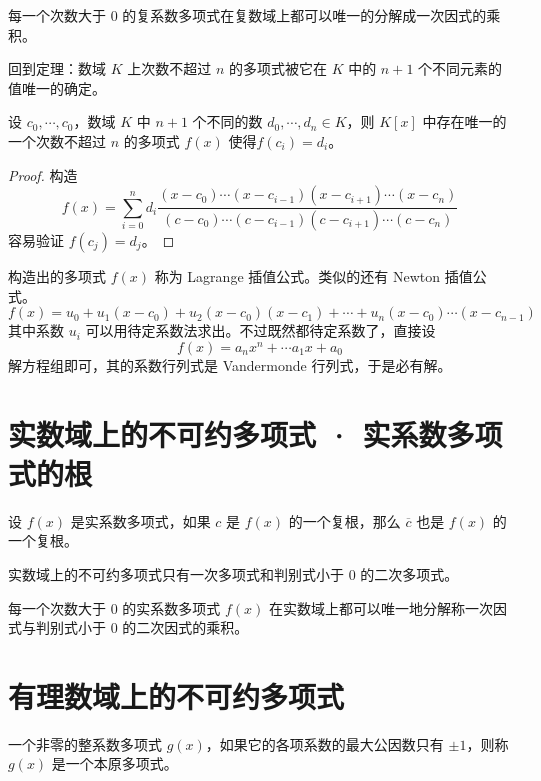 \begin{theorem}
    每一个次数大于 $0$ 的复系数多项式在复数域上都可以唯一的分解成一次因式的乘积。
\end{theorem}

回到定理：数域 $K$ 上次数不超过 $n$ 的多项式被它在 $K$ 中的 $n+1$ 个不同元素的值唯一的确定。

\begin{theorem}
    设 $c_0,\cdots,c_0$，数域 $K$ 中 $n+1$ 个不同的数 $d_0,\cdots,d_n \in K$，则 $K[x]$ 中存在唯一的一个次数不超过 $n$ 的多项式 $f(x)$ 使得$f(c_i) = d_i$。
\end{theorem}
\begin{proof}
    构造
    \[ f(x) = \sum_{i=0}^n d_i \frac{(x-c_0)\cdots(x-c_{i-1})(x-c_{i+1})\cdots(x-c_n)}{(c-c_0)\cdots(c-c_{i-1})(c-c_{i+1})\cdots(c-c_n)} \]
    容易验证 $f(c_j) = d_j$。
\end{proof}

构造出的多项式 $f(x)$ 称为 Lagrange 插值公式。类似的还有 Newton 插值公式。
\[ f(x) = u_0 + u_1(x-c_0) + u_2(x-c_0)(x-c_1) + \cdots + u_n(x-c_0)\cdots(x-c_{n-1}) \]
其中系数 $u_i$ 可以用待定系数法求出。不过既然都待定系数了，直接设
\[ f(x) = a_nx^n + \cdots a_1x + a_0 \]
解方程组即可，其的系数行列式是 Vandermonde 行列式，于是必有解。

\section{实数域上的不可约多项式 · 实系数多项式的根}

\begin{theorem}
    设 $f(x)$ 是实系数多项式，如果 $c$ 是 $f(x)$ 的一个复根，那么 $\overline{c}$ 也是 $f(x)$ 的一个复根。
\end{theorem}

\begin{theorem}
    实数域上的不可约多项式只有一次多项式和判别式小于 $0$ 的二次多项式。
\end{theorem}

\begin{theorem}
    每一个次数大于 $0$ 的实系数多项式 $f(x)$ 在实数域上都可以唯一地分解称一次因式与判别式小于 $0$ 的二次因式的乘积。
\end{theorem}

\section{有理数域上的不可约多项式}

\begin{definition}
    一个非零的整系数多项式 $g(x)$，如果它的各项系数的最大公因数只有 $\pm 1$，则称 $g(x)$ 是一个本原多项式。
\end{definition}


